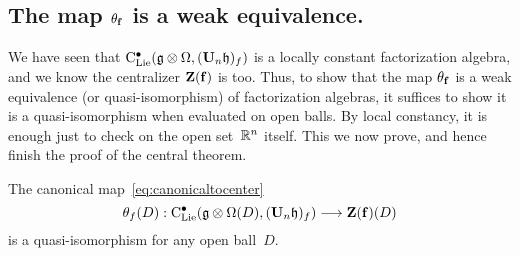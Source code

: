 \documentclass[11pt]{amsart}
\numberwithin{equation}{section}
\begin{document}
\subsection{The map $\theta_{{\bf f}}$ is a weak equivalence.} 

We have seen that ${\rm C}_{\rm Lie}^\bullet(\mathfrak g\otimes \Omega , (\mathbf U_n \mathfrak h )_f)$ is a locally constant factorization algebra,
and we know the centralizer $\mathbf Z({\bf f})$ is too.
Thus, to show that the map $\theta_{{\bf f}}$ is a weak equivalence (or quasi-isomorphism) of factorization algebras,
it suffices to show it is a quasi-isomorphism when evaluated on open balls.
By local constancy, it is enough just to check on the open set~$\mathbb R^n$ itself.
This we now prove, and hence finish the proof of the central theorem.

\begin{lmm}
\label{L:thetaquisondisk}
The canonical map~\eqref{eq:canonicaltocenter}
\[
\theta_f(D): {\rm C}_{\rm Lie}^\bullet(\mathfrak g\otimes \Omega (D),  (\mathbf U_n \mathfrak h)_f) \longrightarrow \mathbf Z(\mathbf{f})(D)
\] 
 is a quasi-isomorphism for any open ball~$D$.
\end{lmm}
\end{document}
